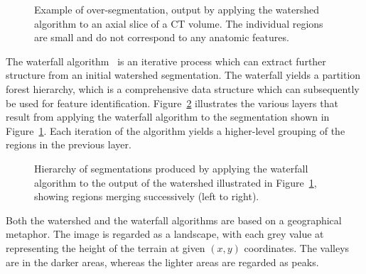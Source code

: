\documentclass{article}
\begin{document}
\begin{figure}
\centering
\ifpdf
        \hspace{1mm}%
\else
\fi
\caption{Example of over-segmentation, output by applying the watershed
  algorithm to an axial slice of a CT volume. The individual regions
  are small and do not correspond to any anatomic features.}
\label{fig:oversegmented}
\end{figure}
%
The waterfall algorithm~\cite{beucher94,marcotegui} is an iterative process which can extract
further structure from an initial watershed segmentation. The
waterfall yields a partition forest hierarchy, which is a
comprehensive data structure which  can subsequently be used  for
feature identification.  Figure~\ref{fig:waterfall} illustrates the
various layers that result from applying the waterfall algorithm to
the segmentation shown in Figure~\ref{fig:oversegmented}.  Each
iteration of the algorithm yields a higher-level grouping of the
regions in the previous layer.
\begin{figure}
\centering
\ifpdf
        \hspace{1mm}%
        \hspace{1mm}%
\else
\fi
\caption{Hierarchy of segmentations produced by applying the waterfall
  algorithm to the output of the watershed illustrated in
  Figure~\ref{fig:oversegmented}, showing regions merging successively
  (left to right).}
\label{fig:waterfall}
\end{figure}

Both the watershed and the waterfall algorithms are based on a
geographical metaphor. The image is regarded as a landscape, with each
grey value at representing the height of the terrain at given $(x,y)$
coordinates.
%
The valleys are
in the darker areas, whereas the lighter areas are regarded as peaks.
\end{document}

